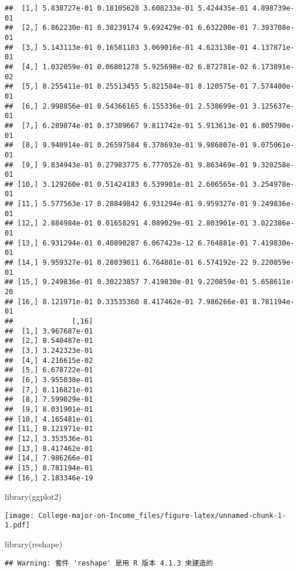 \documentclass[
]{article}
\newenvironment{Shaded}{\begin{snugshade}}{\end{snugshade}}
\newcommand{\FunctionTok}[1]{\textcolor[rgb]{0.00,0.00,0.00}{#1}}
\newcommand{\NormalTok}[1]{#1}
\newcommand{\OtherTok}[1]{\textcolor[rgb]{0.56,0.35,0.01}{#1}}
\newcommand{\SpecialCharTok}[1]{\textcolor[rgb]{0.00,0.00,0.00}{#1}}
\begin{document}
\begin{verbatim}
##  [1,] 5.838727e-01 0.18105628 3.608233e-01 5.424435e-01 4.898739e-01
##  [2,] 6.862230e-01 0.38239174 9.692429e-01 6.632200e-01 7.393708e-01
##  [3,] 5.143113e-01 0.16581103 3.069016e-01 4.623138e-01 4.137871e-01
##  [4,] 1.032059e-01 0.06801278 5.925698e-02 6.872781e-02 6.173891e-02
##  [5,] 8.255411e-01 0.25513455 5.821584e-01 8.120575e-01 7.574400e-01
##  [6,] 2.998856e-01 0.54366165 6.155336e-01 2.538699e-01 3.125637e-01
##  [7,] 6.289874e-01 0.37389667 9.811742e-01 5.913613e-01 6.805790e-01
##  [8,] 9.940914e-01 0.26597584 6.378693e-01 9.986807e-01 9.075061e-01
##  [9,] 9.834943e-01 0.27983775 6.777052e-01 9.863469e-01 9.320258e-01
## [10,] 3.129260e-01 0.51424183 6.539901e-01 2.606565e-01 3.254978e-01
## [11,] 5.577563e-17 0.28849842 6.931294e-01 9.959327e-01 9.249836e-01
## [12,] 2.884984e-01 0.01658291 4.089029e-01 2.803901e-01 3.022386e-01
## [13,] 6.931294e-01 0.40890287 6.067423e-12 6.764881e-01 7.419830e-01
## [14,] 9.959327e-01 0.28039011 6.764881e-01 6.574192e-22 9.220859e-01
## [15,] 9.249836e-01 0.30223857 7.419830e-01 9.220859e-01 5.658611e-20
## [16,] 8.121971e-01 0.33535360 8.417462e-01 7.986266e-01 8.781194e-01
##              [,16]
##  [1,] 3.967687e-01
##  [2,] 8.540487e-01
##  [3,] 3.242323e-01
##  [4,] 4.216615e-02
##  [5,] 6.678722e-01
##  [6,] 3.955038e-01
##  [7,] 8.116821e-01
##  [8,] 7.599029e-01
##  [9,] 8.031901e-01
## [10,] 4.165481e-01
## [11,] 8.121971e-01
## [12,] 3.353536e-01
## [13,] 8.417462e-01
## [14,] 7.986266e-01
## [15,] 8.781194e-01
## [16,] 2.183346e-19
\end{verbatim}

\begin{Shaded}
\begin{Highlighting}[]
\FunctionTok{library}\NormalTok{(ggplot2)}
\end{Highlighting}
\end{Shaded}

\texttt{[image: College-major-on-Income\_files/figure-latex/unnamed-chunk-1-1.pdf]}

\begin{Shaded}
\begin{Highlighting}[]
\FunctionTok{library}\NormalTok{(reshape)}
\end{Highlighting}
\end{Shaded}

\begin{verbatim}
## Warning: 套件 'reshape' 是用 R 版本 4.1.3 來建造的
\end{verbatim}

\begin{Shaded}
\end{Shaded}
\end{document}

